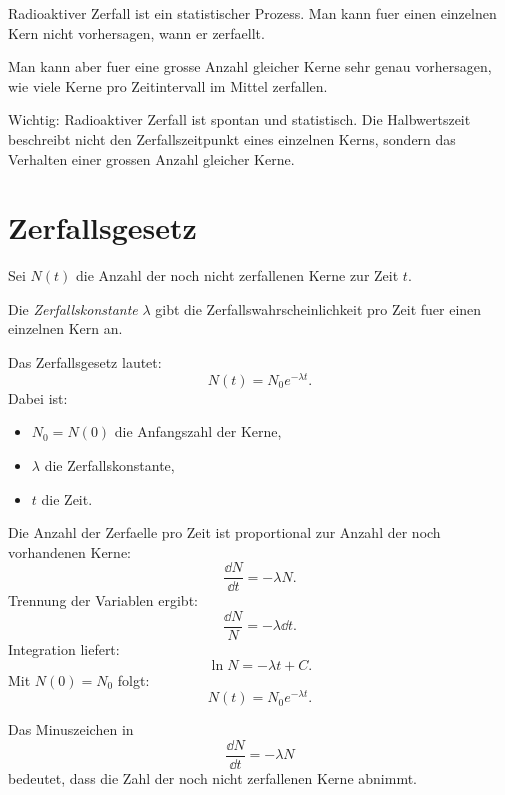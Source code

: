 \begin{conceptbox}
Radioaktiver Zerfall ist ein statistischer Prozess.
Man kann fuer einen einzelnen Kern nicht vorhersagen, wann er zerfaellt.

Man kann aber fuer eine grosse Anzahl gleicher Kerne sehr genau vorhersagen,
wie viele Kerne pro Zeitintervall im Mittel zerfallen.
\end{conceptbox}

\begin{examtipbox}
Wichtig:
Radioaktiver Zerfall ist spontan und statistisch.
Die Halbwertszeit beschreibt nicht den Zerfallszeitpunkt eines einzelnen Kerns,
sondern das Verhalten einer grossen Anzahl gleicher Kerne.
\end{examtipbox}

\section{Zerfallsgesetz}

Sei $N(t)$ die Anzahl der noch nicht zerfallenen Kerne zur Zeit $t$.

\begin{definitionbox}
Die \emph{Zerfallskonstante} $\lambda$ gibt die Zerfallswahrscheinlichkeit pro Zeit
fuer einen einzelnen Kern an.
\end{definitionbox}

\begin{formulabox}
Das Zerfallsgesetz lautet:
\[
    N(t)=N_0 e^{-\lambda t}.
\]
Dabei ist:
\begin{itemize}
    \item $N_0=N(0)$ die Anfangszahl der Kerne,
    \item $\lambda$ die Zerfallskonstante,
    \item $t$ die Zeit.
\end{itemize}
\end{formulabox}

\begin{derivationbox}
Die Anzahl der Zerfaelle pro Zeit ist proportional zur Anzahl der noch vorhandenen
Kerne:
\[
    \frac{\dd N}{\dd t}=-\lambda N.
\]
Trennung der Variablen ergibt:
\[
    \frac{\dd N}{N}=-\lambda \dd t.
\]
Integration liefert:
\[
    \ln N = -\lambda t + C.
\]
Mit $N(0)=N_0$ folgt:
\[
    N(t)=N_0 e^{-\lambda t}.
\]
\end{derivationbox}

\begin{conceptbox}
Das Minuszeichen in
\[
    \frac{\dd N}{\dd t}=-\lambda N
\]
bedeutet, dass die Zahl der noch nicht zerfallenen Kerne abnimmt.
\end{conceptbox}

